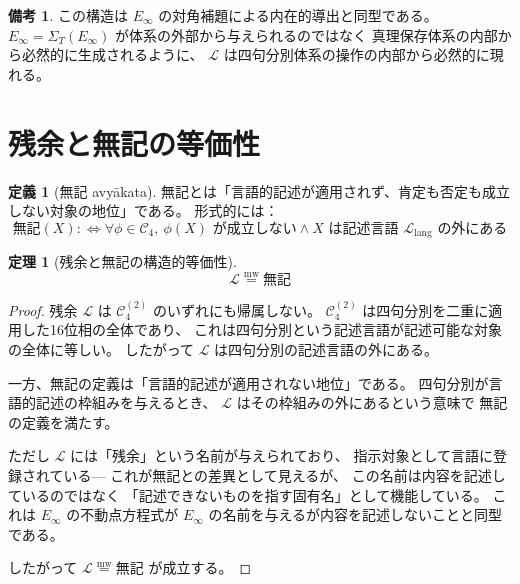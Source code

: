 \documentclass[11pt,a4paper]{article}
\theoremstyle{definition}
\newtheorem{definition}{定義}[section]
\newtheorem{theorem}{定理}[section]
\newtheorem{remark}{備考}[section]
\newcommand{\mweq}{\mathrel{\overset{\mathrm{mw}}{=}}}
\newcommand{\Einfty}{E_\infty}
\begin{document}
\begin{remark}
この構造は $\Einfty$ の対角補題による内在的導出と同型である。
$\Einfty = \Sigma_T(\Einfty)$ が体系の外部から与えられるのではなく
真理保存体系の内部から必然的に生成されるように、
$\mathcal{L}$ は四句分別体系の操作の内部から必然的に現れる。
\end{remark}

\section{残余と無記の等価性}

\begin{definition}[無記 avyākata]
無記とは「言語的記述が適用されず、肯定も否定も成立しない対象の地位」である。
形式的には：
\begin{equation}
\text{無記}(X) :\Leftrightarrow 
\forall \phi \in \mathcal{C}_4,\ \phi(X) \text{ が成立しない}
\wedge X \text{ は記述言語 } \mathcal{L}_{\mathrm{lang}} \text{ の外にある}
\end{equation}
\end{definition}

\begin{theorem}[残余と無記の構造的等価性]
\begin{equation}
\mathcal{L} \mweq \text{無記}
\end{equation}
\end{theorem}

\begin{proof}
残余 $\mathcal{L}$ は $\mathcal{C}_4^{(2)}$ のいずれにも帰属しない。
$\mathcal{C}_4^{(2)}$ は四句分別を二重に適用した16位相の全体であり、
これは四句分別という記述言語が記述可能な対象の全体に等しい。
したがって $\mathcal{L}$ は四句分別の記述言語の外にある。

一方、無記の定義は「言語的記述が適用されない地位」である。
四句分別が言語的記述の枠組みを与えるとき、
$\mathcal{L}$ はその枠組みの外にあるという意味で
無記の定義を満たす。

ただし $\mathcal{L}$ には「残余」という名前が与えられており、
指示対象として言語に登録されている---
これが無記との差異として見えるが、
この名前は内容を記述しているのではなく
「記述できないものを指す固有名」として機能している。
これは $\Einfty$ の不動点方程式が
$\Einfty$ の名前を与えるが内容を記述しないことと同型である。

したがって $\mathcal{L} \mweq \text{無記}$ が成立する。
\end{proof}
\end{document}
